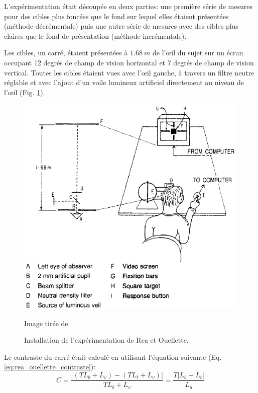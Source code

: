 	\par L'expérimentation était découpée en deux parties: une première série de mesures pour des cibles plus foncées que le fond sur lequel elles étaient présentées (méthode décrémentale) puis une autre série de mesures avec des cibles plus claires que le fond de présentation (méthode incrémentale).
	
	\par Les cibles, un carré, étaient présentées à $1.68~m$ de l'œil du sujet sur un écran occupant 12 degrés de champ de vision horizontal et 7 degrés de champ de vision vertical. Toutes les cibles étaient vues avec l'œil gauche, à travers un filtre neutre réglable et avec l'ajout d'un voile lumineux artificiel directement au niveau de l'œil (Fig. \ref{fig:rea_apparatus}).
	
	\begin{figure}
		\centering
		\includegraphics[scale=.75]{Figures/ReactionTimeApparatus}
		\caption{Installation de l'expérimentation de Rea et Ouellette.}{Image tirée de \citep{rea_visual_1988}}
		\label{fig:rea_apparatus}
	\end{figure}
	
	\par Le contraste du carré était calculé en utilisant l'équation suivante (Eq. \ref{eq:rea_ouellette_contraste}):
	 \begin{equation}
		C = \frac{\vert (T L_b + L_v) - (T L_t + L_v) \vert}{T L_b + L_v} = \frac{T \vert L_b - L_t \vert}{L_a}
		\label{eq:rea_ouellette_contraste}
	\end{equation}
	

